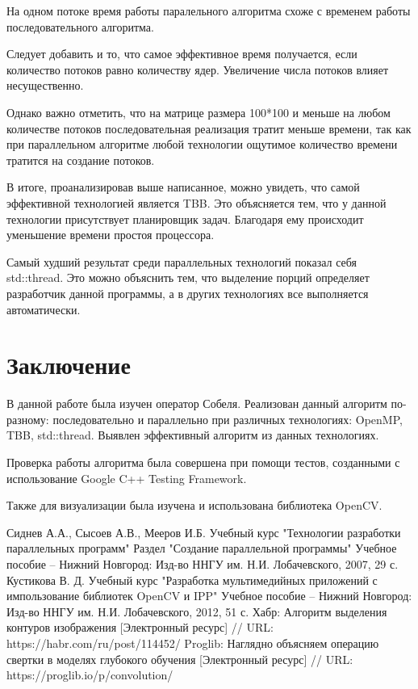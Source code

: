 \documentclass[14pt, a4paper]{extreport}
\begin{document}
На одном потоке время работы паралельного алгоритма схоже с временем работы последовательного алгоритма.

Следует добавить и то, что самое эффективное время получается, если количество потоков равно количеству ядер. Увеличение числа потоков влияет несущественно.

Однако важно отметить, что на матрице размера 100*100 и меньше на любом количестве потоков последовательная реализация тратит меньше времени, так как при параллельном алгоритме любой технологии ощутимое количество времени тратится на создание потоков.

В итоге, проанализировав выше написанное, можно увидеть, что самой эффективной технологией является TBB. Это объясняется тем, что у данной технологии присутствует планировщик задач. Благодаря ему происходит уменьшение времени простоя процессора.

Самый худший результат среди параллельных технологий показал себя std::thread. Это можно объяснить тем, что выделение порций определяет разработчик данной программы,  а в других технологиях все выполняется автоматически.

\newpage
\section*{Заключение}

В данной работе была изучен оператор Собеля. Реализован данный алгоритм по-разному: последовательно и параллельно при различных технологиях: OpenMP, TBB, std::thread. Выявлен эффективный алгоритм из данных технологиях.

Проверка работы алгоритма была совершена при помощи тестов, созданными с использование Google C++ Testing Framework.

Также для визуализации была изучена и использована библиотека OpenCV.

\newpage
\begin{thebibliography}{1}
Сиднев А.А., Сысоев А.В., Мееров И.Б. Учебный курс "Технологии разработки параллельных программ" Раздел "Создание параллельной программы" Учебное пособие – Нижний Новгород: Изд-во ННГУ им. Н.И. Лобачевского, 2007, 29 с.
Кустикова В. Д. Учебный курс "Разработка мультимедийных приложений с импользование библиотек OpenCV и IPP" Учебное пособие – Нижний Новгород: Изд-во ННГУ им. Н.И. Лобачевского, 2012, 51 с.
 Хабр: Алгоритм выделения контуров изображения [Электронный ресурс] // URL: https://habr.com/ru/post/114452/
 Proglib: Наглядно объясняем операцию свертки в моделях глубокого обучения [Электронный ресурс] // URL: https://proglib.io/p/convolution/
\end{thebibliography}
\newpage
\end{document}

